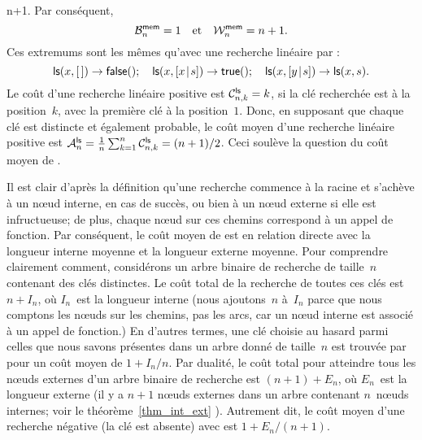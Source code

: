 n+1\).
Par conséquent,
\begin{equation*}
\B{\fun{mem}}{n} = 1\quad\text{et}\quad \W{\fun{mem}}{n} = n + 1.
\index{mem@$\B{\fun{mem}}{n}$}\index{mem@$\W{\fun{mem}}{n}$}
\end{equation*}
Ces extremums sont les mêmes qu'avec une recherche
linéaire par
:
\begin{equation*}
\fun{ls}(x,\el)          \rightarrow  \fun{false}();\quad
\fun{ls}(x,\cons{x}{s})  \rightarrow  \fun{true}();\quad
\fun{ls}(x,\cons{y}{s})  \rightarrow  \fun{ls}(x,s).
\end{equation*}
Le coût d'une recherche linéaire positive est \(\C{\fun{ls}}{n,k} =
k\), si la clé recherchée est à la position~\(k\), avec la première
clé à la position~\(1\). Donc, en supposant que chaque clé est
distincte et également probable, le coût moyen d'une recherche
linéaire positive est \(\M{\fun{ls}}{n} =
\frac{1}{n}\sum_{k=1}^{n}\C{\fun{ls}}{n,k} =
(n+1)/2\). Ceci
soulève la question du coût moyen de
.


Il est clair d'après la définition qu'une recherche commence à la
racine et s'achève à un n{\oe}ud interne, en cas de succès, ou bien à
un n{\oe}ud externe si elle est infructueuse; de plus, chaque n{\oe}ud
sur ces chemins correspond à un appel de fonction. Par conséquent, le
coût moyen de  est en relation
directe avec la longueur interne moyenne et la longueur externe moyenne. Pour comprendre clairement
comment, considérons un arbre binaire de recherche de taille~\(n\)
contenant des clés distinctes. Le coût total de la recherche de toutes
ces clés est \(n+I_n\), où \(I_n\)~est la longueur interne (nous
ajoutons~\(n\) à~\(I_n\) parce que nous comptons les n{\oe}uds sur les
chemins, pas les arcs, car un n{\oe}ud interne est associé à un appel
de fonction.)  En d'autres termes, une clé choisie au hasard parmi
celles que nous savons présentes dans un arbre donné de taille~\(n\)
est trouvée par  pour un coût moyen de \(1+I_n/n\). Par
dualité, le coût total pour atteindre tous les n{\oe}uds externes d'un
arbre binaire de recherche est \((n+1)+E_n\), où \(E_n\)~est la
longueur externe (il y a \(n+1\) n{\oe}uds externes dans un arbre
contenant \(n\)~n{\oe}uds internes; voir le théorème~\ref{thm_int_ext}
). Autrement dit, le coût moyen d'une recherche
négative (la clé est absente) avec 
est \(1 + E_n/(n+1)\).

